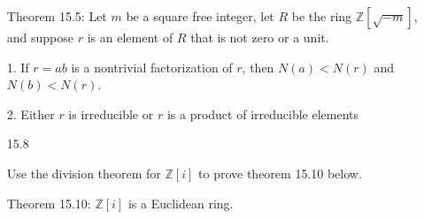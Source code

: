 \documentclass[12pt]{article}
\begin{document}
\begin{itemize}
	Theorem 15.5:	Let $m$ be a square free integer, let $R$ be the ring $\mathbb{Z}[\sqrt{-m}]$, and suppose $r$ is an element of $R$ that is not zero or a unit.

	1. If $r = ab$ is a nontrivial factorization of $r$, then $N(a) < N(r)$ and $N(b) < N(r)$.

	2. Either $r$ is irreducible or $r$ is a product of irreducible elements

\newpage 
\item[15.8]

	Use the division theorem for $\mathbb{Z}[i]$ to prove theorem 15.10 below.

	Theorem 15.10: $\mathbb{Z}[i]$ is a Euclidean ring.
	

\end{itemize}
\end{document}
